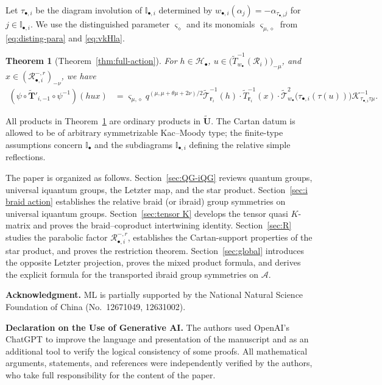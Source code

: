 \documentclass[a4paper,reqno,12pt]{amsart}
\numberwithin{equation}{section}
\theoremstyle{definition}
\theoremstyle{plain}
\newtheorem{introtheorem}{Theorem}
\theoremstyle{definition}
\def\I{\mathbb I}
\def\bI{\I_\bullet}
\def\bIi{\I_{\bullet,i}}
\def\bw{w_\bullet}
\def\bwi{w_{\bullet,i}}
\def\br{\mathbf r}
\def\tU{\widetilde{\mathbf U}}
\def\tTD{\widetilde T}
\def\tT{\widetilde{\mathscr T}}
\def\tTT{\widetilde{\mathbf T}}
\def\cA{\mathcal A}
\def\cR{\mathcal R}
\def\cH{\mathcal H}
\def\cK{\mathcal K}
\def\vs{\varsigma}
\def\bvs{\boldsymbol\varsigma}
\def\dm{\diamond}
\def \bvs{{\boldsymbol{\varsigma}}}
\newcommand{\tTa}[1]{\tTT'_{#1,-1}}
\begin{document}
\begin{samepage}
Let $\tau_{\bullet,i}$ be the
diagram involution of $\bIi$ determined by
$\bwi(\alpha_j)=-\alpha_{\tau_{\bullet,i}j}$ for $j\in\bIi$.
We use the distinguished parameter $\bvs_\dm$ and its monomials
$\vs_{\mu,\dm}$ from \eqref{eq:disting-para} and \eqref{eq:vkHla}.

\begin{introtheorem}[Theorem~\ref{thm:full-action}]
\label{thm:intro-full-action}
For $h\in\cH_\bullet$,
$u\in\bigl(\tTD_{\bw}^{-1}(\cR_i)\bigr)_{-\mu}$, and
$x\in(\cR_{\bullet,i}^{-,r})_{-\nu}$, we have
\begin{align*}
  (\psi\circ\tTa{i}\circ\psi^{-1})(hux)
  &={\vs_{\mu,\dm}}
    q^{(\mu,\mu+\theta\mu+2\nu)/2}
    \tT_{\br_i}^{-1}(h)\cdot\tTD_{\br_i}^{-1}(x)
\cdot
    \tT_{\bw}^{2}\bigl(\tau_{\bullet,i}(\tau(u))\bigr)
    \cK_{\tau_{\bullet,i}\tau\mu}^{-1}.
\end{align*}
\end{introtheorem}
\end{samepage}

All products in Theorem~\ref{thm:intro-full-action} are ordinary products in $\tU$. The Cartan datum is allowed to be of arbitrary symmetrizable Kac--Moody type; the finite-type assumptions concern $\bI$ and the subdiagrams $\bIi$ defining the relative simple reflections.


The paper is organized as follows.  Section~\ref{sec:QG-iQG}  reviews quantum groups, universal $\mathrm i$quantum groups, the Letzter map, and the star product. Section~\ref{sec:i braid action} establishes the relative braid (or ibraid) group symmetries on universal $\mathrm i$quantum groups. Section~\ref{sec:tensor K} develops the tensor quasi $K$-matrix and proves the braid--coproduct intertwining identity.  Section~\ref{sec:R} studies the parabolic factor $\cR_{\bullet,i}^{-,r}$, establishes the Cartan-support properties of the star product, and proves the restriction theorem.  Section~\ref{sec:global} introduces the opposite Letzter projection, proves the mixed product formula, and derives the explicit formula for the transported ibraid group symmetries on $\cA$.


\medskip
\noindent\textbf{Acknowledgment.}
ML is partially supported by the National Natural Science Foundation of
China (No.~12671049, 12631002).

\medskip
\noindent\textbf{Declaration on the Use of Generative AI.}
The authors used OpenAI's ChatGPT to improve the language and presentation of
the manuscript and as an additional tool to verify the logical consistency
of some proofs. All mathematical arguments, statements, and references were
independently verified by the authors, who take full responsibility for the
content of the paper.
\end{document}
